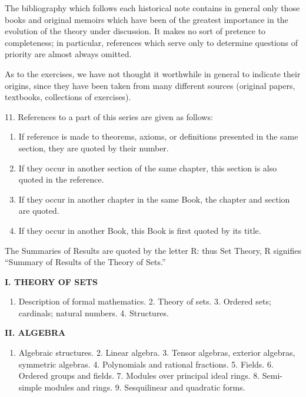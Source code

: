 The bibliography which follows each historical note contains in general only those books and original memoirs which have been of the greatest importance in the evolution of the theory under discussion. It makes no sort of pretence to completeness; in particular, references which serve only to determine questions of priority are almost always omitted.

As to the exercises, we have not thought it worthwhile in general to indicate their origins, since they have been taken from many different sources (original papers, textbooks, collections of exercises).

11. References to a part of this series are given as follows:\par

\begin{enumerate}
\def\labelenumi{\alph{enumi})}
\item
  If reference is made to theorems, axioms, or definitions presented in the same section, they are quoted by their number.
\item
  If they occur in another section of the same chapter, this section is also quoted in the reference.
\item
  If they occur in another chapter in the same Book, the chapter and section are quoted.
\item
  If they occur in another Book, this Book is first quoted by its title.
\end{enumerate}

The Summaries of Results are quoted by the letter R: thus Set Theory, R signifies ``Summary of Results of the Theory of Sets.''


\textbf{I. THEORY OF SETS}\par

\begin{enumerate}
\def\labelenumi{\arabic{enumi}.}
\tightlist
\item
  Description of formal mathematics. 2. Theory of sets. 3. Ordered sets; cardinals; natural numbers. 4. Structures.
\end{enumerate}

\textbf{II. ALGEBRA}\par

\begin{enumerate}
\def\labelenumi{\arabic{enumi}.}
\tightlist
\item
  Algebraic structures. 2. Linear algebra. 3. Tensor algebras, exterior algebras, symmetric algebras. 4. Polynomials and rational fractions. 5. Fields. 6. Ordered groups and fields. 7. Modules over principal ideal rings. 8. Semi-simple modules and rings. 9. Sesquilinear and quadratic forms.
\end{enumerate}


